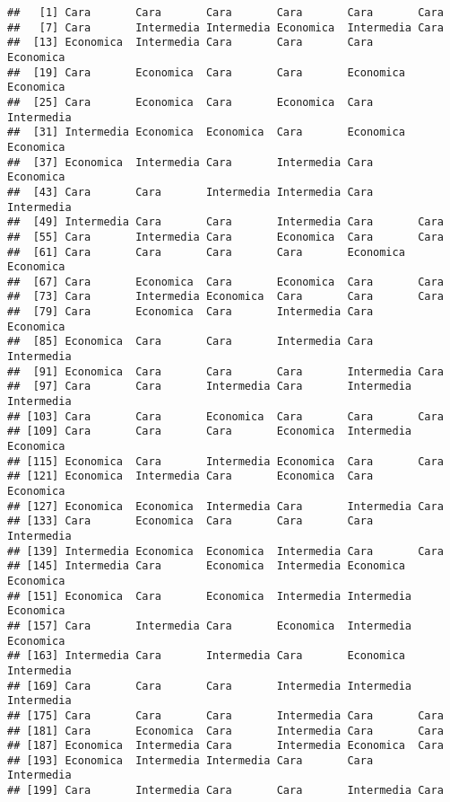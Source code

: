 \documentclass[
]{article}
\begin{document}
\begin{verbatim}
##   [1] Cara       Cara       Cara       Cara       Cara       Cara      
##   [7] Cara       Intermedia Intermedia Economica  Intermedia Cara      
##  [13] Economica  Intermedia Cara       Cara       Cara       Economica 
##  [19] Cara       Economica  Cara       Cara       Economica  Economica 
##  [25] Cara       Economica  Cara       Economica  Cara       Intermedia
##  [31] Intermedia Economica  Economica  Cara       Economica  Economica 
##  [37] Economica  Intermedia Cara       Intermedia Cara       Economica 
##  [43] Cara       Cara       Intermedia Intermedia Cara       Intermedia
##  [49] Intermedia Cara       Cara       Intermedia Cara       Cara      
##  [55] Cara       Intermedia Cara       Economica  Cara       Cara      
##  [61] Cara       Cara       Cara       Cara       Economica  Economica 
##  [67] Cara       Economica  Cara       Economica  Cara       Cara      
##  [73] Cara       Intermedia Economica  Cara       Cara       Cara      
##  [79] Cara       Economica  Cara       Intermedia Cara       Economica 
##  [85] Economica  Cara       Cara       Intermedia Cara       Intermedia
##  [91] Economica  Cara       Cara       Cara       Intermedia Cara      
##  [97] Cara       Cara       Intermedia Cara       Intermedia Intermedia
## [103] Cara       Cara       Economica  Cara       Cara       Cara      
## [109] Cara       Cara       Cara       Economica  Intermedia Economica 
## [115] Economica  Cara       Intermedia Economica  Cara       Cara      
## [121] Economica  Intermedia Cara       Economica  Cara       Economica 
## [127] Economica  Economica  Intermedia Cara       Intermedia Cara      
## [133] Cara       Economica  Cara       Cara       Cara       Intermedia
## [139] Intermedia Economica  Economica  Intermedia Cara       Cara      
## [145] Intermedia Cara       Economica  Intermedia Economica  Economica 
## [151] Economica  Cara       Economica  Intermedia Intermedia Economica 
## [157] Cara       Intermedia Cara       Economica  Intermedia Economica 
## [163] Intermedia Cara       Intermedia Cara       Economica  Intermedia
## [169] Cara       Cara       Cara       Intermedia Intermedia Intermedia
## [175] Cara       Cara       Cara       Intermedia Cara       Cara      
## [181] Cara       Economica  Cara       Intermedia Cara       Cara      
## [187] Economica  Intermedia Cara       Intermedia Economica  Cara      
## [193] Economica  Intermedia Intermedia Cara       Cara       Intermedia
## [199] Cara       Intermedia Cara       Cara       Intermedia Cara      

\end{verbatim}
\end{document}
